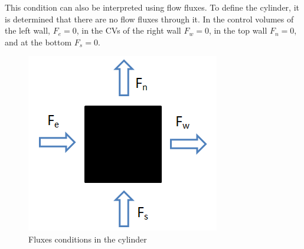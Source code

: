 This condition can also be interpreted using flow fluxes. To define the cylinder, it is determined that there are no flow fluxes through it. In the control volumes of the left wall, $F_{e}=0$, in the CVs of the right wall $F_{w}=0$, in the top wall $F_{n}=0$, and at the bottom $F_{s}=0$.
\begin{figure}[h]
	\centering
	\includegraphics[scale=0.6]{Square/Fluxes}
	\caption{Fluxes conditions in the cylinder}
	\label{FluxesCondCylinder}
\end{figure}